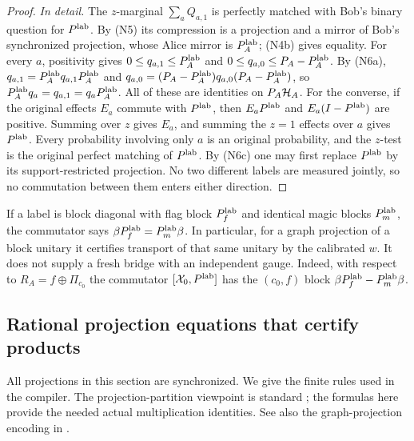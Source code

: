 \begin{proof}
\emph{In detail.} The $z$-marginal $\sum_aQ_{a,1}$ is perfectly matched with Bob's binary question for $P^{\rm lab}$. By (N5) its compression is a projection and a mirror of Bob's synchronized projection, whose Alice mirror is $P^{\rm lab}_A$; (N4b) gives equality. For every $a$, positivity gives $0\leq q_{a,1}\leq P^{\rm lab}_A$ and $0\leq q_{a,0}\leq P_A-P^{\rm lab}_A$. By (N6a), $q_{a,1}=P^{\rm lab}_Aq_{a,1}P^{\rm lab}_A$ and $q_{a,0}=(P_A-P^{\rm lab}_A)q_{a,0}(P_A-P^{\rm lab}_A)$, so $P^{\rm lab}_Aq_a=q_{a,1}=q_aP^{\rm lab}_A$. All of these are identities on $P_A\mathcal H_A$. For the converse, if the original effects $E_a$ commute with $P^{\rm lab}$, then $E_aP^{\rm lab}$ and $E_a(I-P^{\rm lab})$ are positive. Summing over $z$ gives $E_a$, and summing the $z=1$ effects over $a$ gives $P^{\rm lab}$. Every probability involving only $a$ is an original probability, and the $z$-test is the original perfect matching of $P^{\rm lab}$. By (N6c) one may first replace $P^{\rm lab}$ by its support-restricted projection. No two different labels are measured jointly, so no commutation between them enters either direction.
\end{proof}

If a label is block diagonal with flag block $P^{\rm lab}_{f}$ and identical magic blocks $P^{\rm lab}_{m}$, the commutator says $\beta P^{\rm lab}_{f}=P^{\rm lab}_{m}\beta$. In particular, for a graph projection of a block unitary it certifies transport of that same unitary by the calibrated $w$. It does not supply a fresh bridge with an independent gauge.
Indeed, with respect to $R_A=f\oplus\Pi_{c_0}$ the commutator $[\mathcal X_0,P^{\rm lab}]$ has the $(c_0,f)$ block $\beta P^{\rm lab}_f-P^{\rm lab}_m\beta$.

\subsection{Rational projection equations that certify products}\label{sec:projection}
All projections in this section are synchronized. We give the finite rules used in the compiler. The projection-partition viewpoint is standard \cite{Fritz}; the formulas here provide the needed actual multiplication identities. See also the graph-projection encoding in \cite[Section 4]{CZ}.

